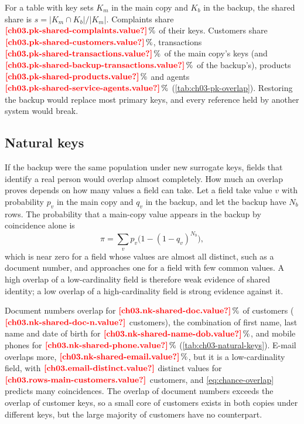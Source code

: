 For a table with key sets $K_m$ in the main copy and $K_b$ in the backup, the shared share is
$s = \lvert K_m \cap K_b \rvert / \lvert K_m \rvert$. Complaints share $\est{ch03.pk-shared-complaints}{value}\,\%$ of
their keys. Customers share $\est{ch03.pk-shared-customers}{value}\,\%$, transactions
$\est{ch03.pk-shared-transactions}{value}\,\%$ of the main copy's keys (and
$\est{ch03.pk-shared-backup-transactions}{value}\,\%$ of the backup's), products
$\est{ch03.pk-shared-products}{value}\,\%$ and agents $\est{ch03.pk-shared-service-agents}{value}\,\%$
(\cref{tab:ch03-pk-overlap}). Restoring the backup would replace most primary keys, and every reference held by
another system would break.



\subsection{Natural keys}

If the backup were the same population under new surrogate keys, fields that identify a real person would overlap
almost completely. How much an overlap proves depends on how many values a field can take. Let a field take value $v$
with probability $p_v$ in the main copy and $q_v$ in the backup, and let the backup have $N_b$ rows. The probability
that a main-copy value appears in the backup by coincidence alone is
\begin{equation}\label{eq:chance-overlap}
  \pi = \sum_v p_v \bigl(1 - (1 - q_v)^{N_b}\bigr),
\end{equation}
which is near zero for a field whose values are almost all distinct, such as a document number, and approaches one
for a field with few common values. A high overlap of a low-cardinality field is therefore weak evidence of shared
identity; a low overlap of a high-cardinality field is strong evidence against it.

Document numbers overlap for $\est{ch03.nk-shared-doc}{value}\,\%$ of customers
($\est{ch03.nk-shared-doc-n}{value}$ customers), the combination of first name, last name and date of birth for
$\est{ch03.nk-shared-name-dob}{value}\,\%$, and mobile phones for $\est{ch03.nk-shared-phone}{value}\,\%$
(\cref{tab:ch03-natural-keys}). E-mail overlaps more, $\est{ch03.nk-shared-email}{value}\,\%$, but it is a
low-cardinality field, with $\est{ch03.email-distinct}{value}$ distinct values for
$\est{ch03.rows-main-customers}{value}$ customers, and \cref{eq:chance-overlap} predicts many coincidences. The overlap of
document numbers exceeds the overlap of customer keys, so a small core of customers exists in both copies under
different keys, but the large majority of customers have no counterpart.

